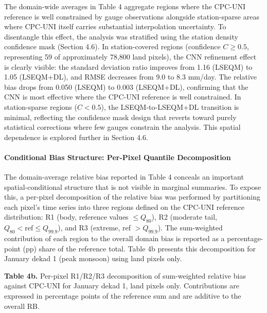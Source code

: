 \documentclass[remotesensing,article,submit,pdftex,moreauthors]{Definitions/mdpi}
\begin{document}
The domain-wide averages in Table 4 aggregate regions where the CPC-UNI
reference is well constrained by gauge observations alongside
station-sparse areas where CPC-UNI itself carries substantial
interpolation uncertainty. To disentangle this effect, the analysis was
stratified using the station density confidence mask (Section 4.6). In
station-covered regions (confidence \(C \geq 0.5\), representing 59 of
approximately 78,800 land pixels), the CNN refinement effect is clearly
visible: the standard deviation ratio improves from 1.16 (LSEQM) to 1.05
(LSEQM+DL), and RMSE decreases from 9.0 to 8.3 mm/day. The relative bias
drops from 0.050 (LSEQM) to 0.003 (LSEQM+DL), confirming that the CNN is
most effective where the CPC-UNI reference is well constrained. In
station-sparse regions (\(C < 0.5\)), the LSEQM-to-LSEQM+DL transition
is minimal, reflecting the confidence mask design that reverts toward
purely statistical corrections where few gauges constrain the analysis.
This spatial dependence is explored further in Section 4.6.

\paragraph{Conditional Bias Structure: Per-Pixel Quantile
Decomposition}

The domain-average relative bias reported in Table 4 conceals an
important spatial-conditional structure that is not visible in marginal
summaries. To expose this, a per-pixel decomposition of the relative
bias was performed by partitioning each pixel's time series into three
regions defined on the CPC-UNI reference distribution: R1 (body,
reference values \(\leq Q_{80}\)), R2 (moderate tail,
\(Q_{80} < \text{ref} \leq Q_{99.9}\)), and R3 (extreme, ref
\(> Q_{99.9}\)). The sum-weighted contribution of each region to the
overall domain bias is reported as a percentage-point (pp) share of the
reference total. Table 4b presents this decomposition for January dekad
1 (peak monsoon) using land pixels only.

\textbf{Table 4b.} Per-pixel R1/R2/R3 decomposition of sum-weighted
relative bias against CPC-UNI for January dekad 1, land pixels only.
Contributions are expressed in percentage points of the reference sum
and are additive to the overall RB.
\end{document}
